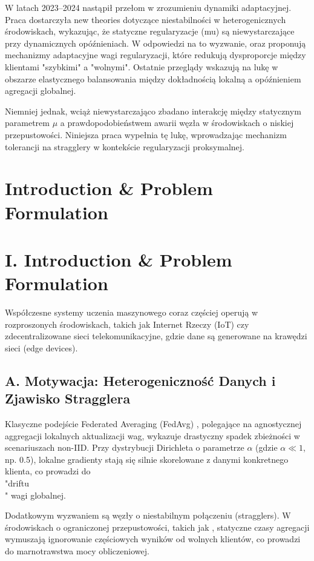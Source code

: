 \documentclass[conference]{IEEEtran}
\begin{document}
W latach 2023--2024 nastąpił przełom w zrozumieniu dynamiki adaptacyjnej. Praca \cite{wang2023tackling} dostarczyła new theories dotyczące niestabilności w heterogenicznych środowiskach, wykazując, że statyczne regularyzacje (mu) są niewystarczające przy dynamicznych opóźnieniach. W odpowiedzi na to wyzwanie, \cite{reddi2023adaptive} oraz \cite{karimireddy2024scaffold} proponują mechanizmy adaptacyjne wagi regularyzacji, które redukują dysproporcje między klientami "szybkimi" a "wolnymi". Ostatnie przeglądy \cite{kairouz2024advances} wskazują na lukę w obszarze elastycznego balansowania między dokładnością lokalną a opóźnieniem agregacji globalnej.

Niemniej jednak, wciąż niewystarczająco zbadano interakcję między statycznym parametrem $\mu$ a prawdopodobieństwem awarii węzła w środowiskach o niskiej przepustowości. Niniejsza praca wypełnia tę lukę, wprowadzając mechanizm tolerancji na stragglery w kontekście regularyzacji proksymalnej.

\section{Introduction \& Problem Formulation}
\section*{I. Introduction \& Problem Formulation}

Współczesne systemy uczenia maszynowego coraz częściej operują w rozproszonych środowiskach, takich jak Internet Rzeczy (IoT) czy zdecentralizowane sieci telekomunikacyjne, gdzie dane są generowane na krawędzi sieci (edge devices). 

\subsection*{A. Motywacja: Heterogeniczność Danych i Zjawisko Stragglera}
Klasyczne podejście Federated Averaging (FedAvg) \cite{mcmahan2017communication}, polegające na agnostycznej aggregacji lokalnych aktualizacji wag, wykazuje drastyczny spadek zbieżności w scenariuszach non-IID. Przy dystrybucji Dirichleta o parametrze $\alpha$ (gdzie $\alpha \ll 1$, np. 0.5), lokalne gradienty stają się silnie skorelowane z danymi konkretnego klienta, co prowadzi do \\"driftu\\" wagi globalnej.

Dodatkowym wyzwaniem są węzły o niestabilnym połączeniu (stragglers). W środowiskach o ograniczonej przepustowości, takich jak \cite{kairouz2024advances}, statyczne czasy agregacji wymuszają ignorowanie częściowych wyników od wolnych klientów, co prowadzi do marnotrawstwa mocy obliczeniowej.
\end{document}
